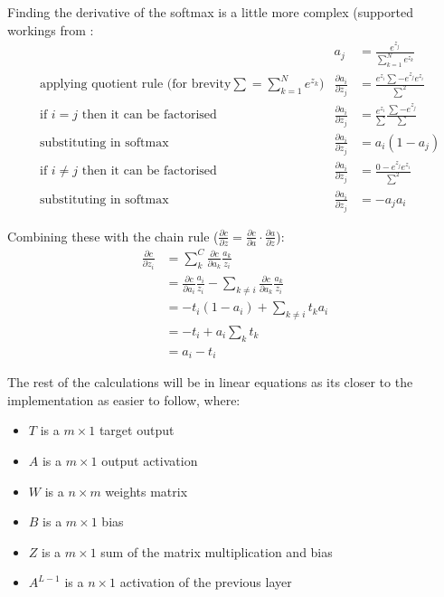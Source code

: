 Finding the derivative of the softmax is a little more complex (supported
workings from \cite{peterSadowski}:
\begin{equation}
    \begin{aligned}
        &       &   a_{j} &= \frac{e^{z_{j}}}{\sum_{k=1}^{N} e^{z_{k}}} \\
        &\text{applying quotient rule (for brevity} \sum = \sum_{k=1}^{N} e^{z_{k}} \text{)}   &   \frac{\partial a_{i}}{\partial z_{j}} &= \frac{e^{z_{i}} \sum - e^{z_{j}}e^{z_{i}}}{\sum^{2}}\\[2em]
        &\text{if } i=j \text{ then it can be factorised}     &   \frac{\partial a_{i}}{\partial z_{j}} &= \frac{e^{z_{i}}}{\sum} \frac{\sum - e^{z_{j}}}{\sum}\\
        &\text{substituting in softmax}     &   \frac{\partial a_{i}}{\partial z_{j}} &= a_{i} (1 - a_{j})\\[2em]
        &\text{if } i \neq j \text{ then it can be factorised}      &   \frac{\partial a_{i}}{\partial z_{j}} &= \frac{0 - e^{z_{j}}e^{z_{i}}}{\sum^{2}}\\
        &\text{substituting in softmax}     &   \frac{\partial a_{i}}{\partial z_{j}} &= -a_{j}a_{i}
    \end{aligned}
\end{equation}

Combining these with the chain rule (\(\frac{\partial c}{\partial z} = \frac{\partial c}{\partial a} \cdot \frac{\partial a}{\partial z}\)):
\begin{equation}
    \begin{aligned}
        \frac{\partial c}{\partial z_{i}} &= \sum_{k}^{C} \frac{\partial c}{\partial a_{k}} \frac{a_{k}}{z_{i}}\\
        &= \frac{\partial c}{\partial a_{i}} \frac{a_{i}}{z_{i}} - \sum_{k \neq i} \frac{\partial c}{\partial a_{k}} \frac{a_{k}}{z_{i}}\\
        &= - t_{i}(1 - a_{i}) + \sum_{k \neq i} t_{k}a_{i}\\
        &= - t_{i} + a_{i} \sum_{k} t_{k}\\
        &= a_{i} - t_{i}
    \end{aligned}
\end{equation}

The rest of the calculations will be in linear equations as its closer to the
implementation as easier to follow, where:
\begin{itemize}
    \item \( T \) is a \( m \times 1 \) target output
    \item \( A \) is a  \( m \times 1 \) output activation
    \item \( W \) is a \( n \times m \) weights matrix
    \item \( B \) is a \( m \times 1 \) bias
    \item \( Z \) is a \( m \times 1 \) sum of the matrix multiplication and bias
    \item \(A^{L-1} \) is a \( n \times 1 \) activation of the previous layer
\end{itemize}

